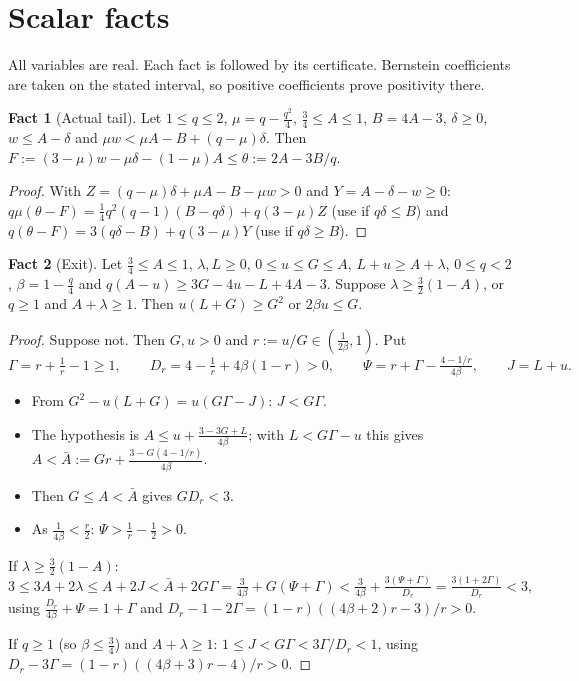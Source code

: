 \documentclass[11pt,a4paper]{article}
\numberwithin{equation}{section}
\theoremstyle{definition}
\newtheorem{fact}{Fact}
\begin{document}
\appendix
\section{Scalar facts}\label{app:facts}

All variables are real. Each fact is followed by its certificate. Bernstein
coefficients are taken on the stated interval, so positive coefficients prove
positivity there.

\begin{fact}[Actual tail]\label{fact:actual}Let $1\le q\le2$, $\mu=q-\frac{q^2}4$, $\frac34\le A\le1$, $B=4A-3$,
$\delta\ge0$, $w\le A-\delta$ and $\mu w<\mu A-B+(q-\mu)\delta$. Then
$F:=(3-\mu)w-\mu\delta-(1-\mu)A\le\theta:=2A-3B/q$.
\end{fact}
\begin{proof}
With $Z=(q-\mu)\delta+\mu A-B-\mu w>0$ and $Y=A-\delta-w\ge0$:
$q\mu(\theta-F)=\frac14q^2(q-1)(B-q\delta)+q(3-\mu)Z$ (use if $q\delta\le B$) and
$q(\theta-F)=3(q\delta-B)+q(3-\mu)Y$ (use if $q\delta\ge B$).
\end{proof}

\begin{fact}[Exit]\label{fact:exit}Let $\frac34\le A\le1$, $\lambda,L\ge0$, $0\le u\le G\le A$, $L+u\ge A+\lambda$,
$0\le q<2$, $\beta=1-\frac q4$ and $q(A-u)\ge3G-4u-L+4A-3$. Suppose
$\lambda\ge\frac32(1-A)$, or $q\ge1$ and $A+\lambda\ge1$. Then $u(L+G)\ge G^2$
or $2\beta u\le G$.
\end{fact}
\begin{proof}
Suppose not. Then $G,u>0$ and $r:=u/G\in(\frac1{2\beta},1)$. Put
\[
\Gamma=r+\tfrac1r-1\ge1,\qquad D_r=4-\tfrac1r+4\beta(1-r)>0,\qquad
\Psi=r+\Gamma-\tfrac{4-1/r}{4\beta},\qquad J=L+u.
\]
\begin{itemize}
\item From $G^2-u(L+G)=u(G\Gamma-J)$: $J<G\Gamma$.
\item The hypothesis is $A\le u+\frac{3-3G+L}{4\beta}$; with $L<G\Gamma-u$
this gives $A<\bar A:=Gr+\frac{3-G(4-1/r)}{4\beta}$.
\item Then $G\le A<\bar A$ gives $GD_r<3$.
\item As $\frac1{4\beta}<\frac r2$: $\Psi>\frac1r-\frac12>0$.
\end{itemize}
If $\lambda\ge\frac32(1-A)$:
\[
3\le3A+2\lambda\le A+2J<\bar A+2G\Gamma=\tfrac3{4\beta}+G(\Psi+\Gamma)
<\tfrac3{4\beta}+\tfrac{3(\Psi+\Gamma)}{D_r}=\tfrac{3(1+2\Gamma)}{D_r}<3,
\]
using $\frac{D_r}{4\beta}+\Psi=1+\Gamma$ and
$D_r-1-2\Gamma=(1-r)((4\beta+2)r-3)/r>0$.

If $q\ge1$ (so $\beta\le\frac34$) and $A+\lambda\ge1$:
$1\le J<G\Gamma<3\Gamma/D_r<1$, using $D_r-3\Gamma=(1-r)((4\beta+3)r-4)/r>0$.
\end{proof}
\end{document}
